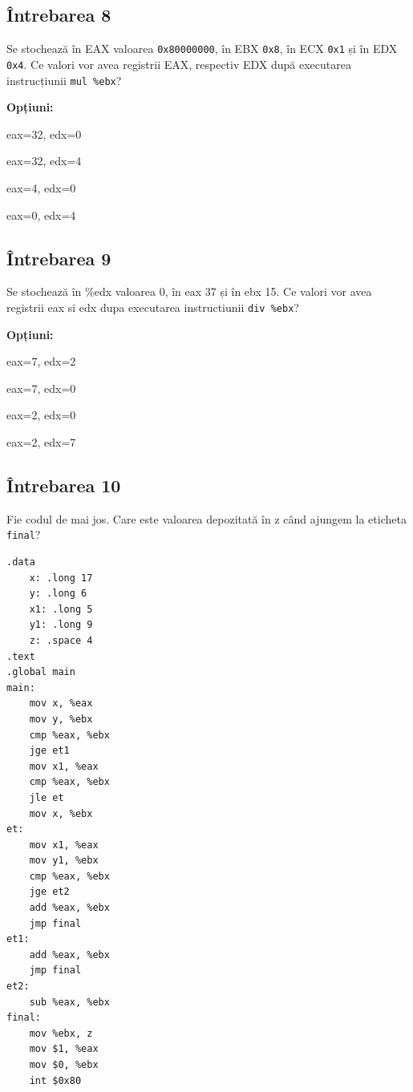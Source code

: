 \documentclass[12pt,a4paper]{article}
\begin{document}
\subsection*{Întrebarea 8}
Se stochează în EAX valoarea \texttt{0x80000000}, în EBX \texttt{0x8}, în ECX \texttt{0x1} și în EDX \texttt{0x4}. Ce valori vor avea registrii EAX, respectiv EDX după executarea instrucțiunii \texttt{mul \%ebx}?

\textbf{Opțiuni:}
\begin{itemize*}
    \item eax=32, edx=0
    \item eax=32, edx=4
    \item eax=4, edx=0
    \item eax=0, edx=4
\end{itemize*}

\subsection*{Întrebarea 9}
Se stochează în \%edx valoarea 0, în eax 37 și în ebx 15. Ce valori vor avea registrii eax si edx dupa executarea instructiunii \texttt{div \%ebx}?

\textbf{Opțiuni:}
\begin{itemize*}
    \item eax=7, edx=2
    \item eax=7, edx=0
    \item eax=2, edx=0
    \item eax=2, edx=7
\end{itemize*}

\subsection*{Întrebarea 10}
Fie codul de mai jos. Care este valoarea depozitată în z când ajungem la eticheta \texttt{final}?
\begin{lstlisting}[language=x86asm, caption={Cod Sursa (Lab 3.2)}]
.data
    x: .long 17
    y: .long 6
    x1: .long 5
    y1: .long 9
    z: .space 4
.text
.global main
main:
    mov x, %eax
    mov y, %ebx
    cmp %eax, %ebx
    jge et1
    mov x1, %eax
    cmp %eax, %ebx
    jle et
    mov x, %ebx
et:
    mov x1, %eax
    mov y1, %ebx
    cmp %eax, %ebx
    jge et2
    add %eax, %ebx
    jmp final
et1:
    add %eax, %ebx
    jmp final
et2:
    sub %eax, %ebx
final:
    mov %ebx, z
    mov $1, %eax
    mov $0, %ebx
    int $0x80
\end{lstlisting}
\end{document}
